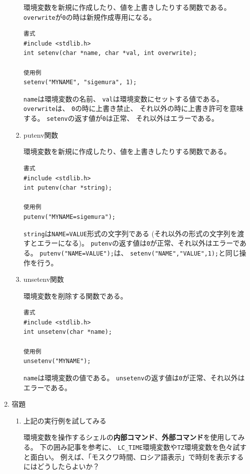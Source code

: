 \documentclass[a4j,dvipdfmx]{jarticle}
\begin{document}
\begin{enumerate}
\begin{enumerate}
環境変数を新規に作成したり、値を上書きしたりする関数である。
\verb/overwrite/が\verb/0/の時は新規作成専用になる。

\begin{lstlisting}[numbers=none]
書式
#include <stdlib.h>
int setenv(char *name, char *val, int overwrite);

使用例
setenv("MYNAME", "sigemura", 1);
\end{lstlisting}

\verb/name/は環境変数の名前、
\verb/val/は環境変数にセットする値である。
\verb/overwrite/は、
\verb/0/の時に上書き禁止、
それ以外の時に上書き許可を意味する。
\verb/setenv/の返す値が\verb/0/は正常、
それ以外はエラーである。

\item putenv関数

環境変数を新規に作成したり、値を上書きしたりする関数である。

\begin{lstlisting}[numbers=none]
書式
#include <stdlib.h>
int putenv(char *string);

使用例
putenv("MYNAME=sigemura");
\end{lstlisting}

\verb/string/は\verb/NAME=VALUE/形式の文字列である
(それ以外の形式の文字列を渡すとエラーになる)。
\verb/putenv/の返す値は\verb/0/が正常、それ以外はエラーである。
\verb/putenv("NAME=VALUE");/は、
\verb/setenv("NAME","VALUE",1);/と同じ操作を行う。

\item unsetenv関数

環境変数を削除する関数である。

\begin{lstlisting}[numbers=none]
書式
#include <stdlib.h>
int unsetenv(char *name);

使用例
unsetenv("MYNAME");
\end{lstlisting}

\verb/name/は環境変数の値である。
\verb/unsetenv/の返す値は\verb/0/が正常、それ以外はエラーである。

\end{enumerate}

\item 宿題

\begin{enumerate}
\item 上記の実行例を試してみる

環境変数を操作するシェルの{\bf 内部コマンド}、{\bf 外部コマンド}を使用してみる。
下の囲み記事を参考に、
\verb/LC_TIME/環境変数や\verb/TZ/環境変数を色々試すと面白い。
例えば、「モスクワ時間、ロシア語表示」で時刻を表示するにはどうしたらよいか？


\end{enumerate}
\end{enumerate}
\end{document}
